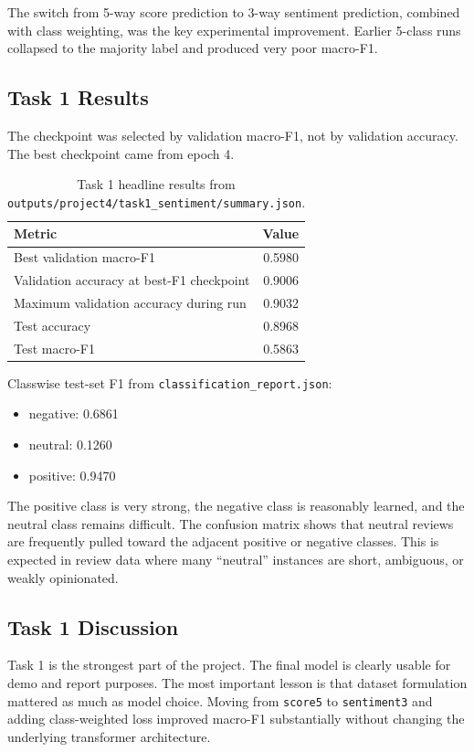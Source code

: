 \documentclass[11pt]{article}
\newcommand{\taskOneValMacro}{0.5980}
\newcommand{\taskOneValAcc}{0.9006}
\newcommand{\taskOneMaxValAcc}{0.9032}
\newcommand{\taskOneTestAcc}{0.8968}
\newcommand{\taskOneTestMacro}{0.5863}
\newcommand{\taskOneNegFOne}{0.6861}
\newcommand{\taskOneNeuFOne}{0.1260}
\newcommand{\taskOnePosFOne}{0.9470}
\begin{document}
The switch from 5-way score prediction to 3-way sentiment prediction, combined with class weighting, was the key experimental improvement. Earlier 5-class runs collapsed to the majority label and produced very poor macro-F1.

\subsection{Task 1 Results}
The checkpoint was selected by validation macro-F1, not by validation accuracy. The best checkpoint came from epoch 4.

\begin{table}[H]
\centering
\begin{tabular}{lr}
\toprule
\textbf{Metric} & \textbf{Value} \\
\midrule
Best validation macro-F1 & \taskOneValMacro \\
Validation accuracy at best-F1 checkpoint & \taskOneValAcc \\
Maximum validation accuracy during run & \taskOneMaxValAcc \\
Test accuracy & \taskOneTestAcc \\
Test macro-F1 & \taskOneTestMacro \\
\bottomrule
\end{tabular}
\caption{Task 1 headline results from \texttt{outputs/project4/task1\_sentiment/summary.json}.}
\label{tab:task1-headline}
\end{table}

Classwise test-set F1 from \texttt{classification\_report.json}:
\begin{itemize}
    \item negative: \taskOneNegFOne
    \item neutral: \taskOneNeuFOne
    \item positive: \taskOnePosFOne
\end{itemize}

The positive class is very strong, the negative class is reasonably learned, and the neutral class remains difficult. The confusion matrix shows that neutral reviews are frequently pulled toward the adjacent positive or negative classes. This is expected in review data where many ``neutral'' instances are short, ambiguous, or weakly opinionated.

\subsection{Task 1 Discussion}
Task 1 is the strongest part of the project. The final model is clearly usable for demo and report purposes. The most important lesson is that dataset formulation mattered as much as model choice. Moving from \texttt{score5} to \texttt{sentiment3} and adding class-weighted loss improved macro-F1 substantially without changing the underlying transformer architecture.
\end{document}
